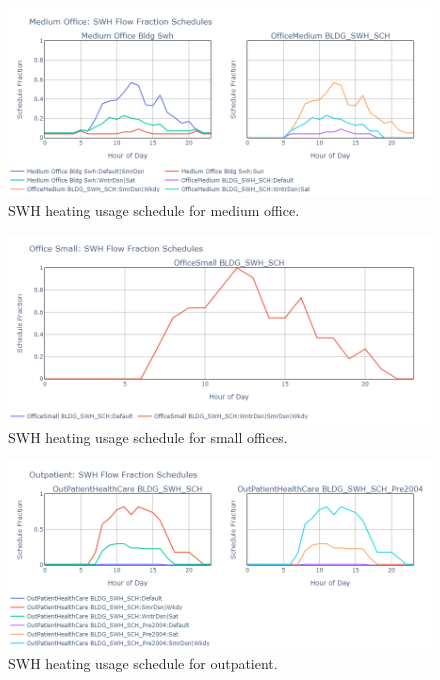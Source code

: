 \begin{figure}
  \centering
  \includegraphics[width=\textwidth]{figures/swh_sched_medium office.png}
  \caption[SWH heating usage schedule for medium office]{SWH heating usage schedule for medium office.}
  \label{fig:swh_sched_medium_office}
\end{figure}

\begin{figure}
  \centering
  \includegraphics[width=\textwidth]{figures/swh_sched_office small.png}
  \caption[SWH heating usage schedule for small offices]{SWH heating usage schedule for small offices.}
  \label{fig:swh_sched_small_office}
\end{figure}

\begin{figure}
  \centering
  \includegraphics[width=\textwidth]{figures/swh_sched_outpatient.png}
  \caption[SWH heating usage schedule for outpatient]{SWH heating usage schedule for outpatient.}
  \label{fig:swh_sched_outpatient}
\end{figure}

